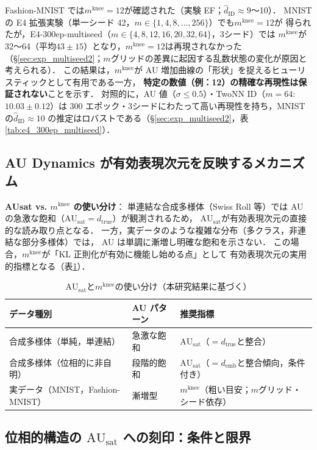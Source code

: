 \documentclass[11pt,a4paper]{jsarticle}
\newcommand{\dtrue}{d_{\mathrm{true}}}
\newcommand{\AUsat}{\mathrm{AU}_{\mathrm{sat}}}
\newcommand{\mknee}{m^{\mathrm{knee}}}
\newcommand{\demb}{d_{\mathrm{emb}}}
\begin{document}
Fashion-MNIST では$\mknee = 12$が確認された（実験 EF；$\hat{d}_\mathrm{ID} \approx 9$〜10）．
MNIST の E4 拡張実験（単一シード 42，$m \in \{1, 4, 8, \ldots, 256\}$）でも$\mknee = 12$が
得られたが，E4-300ep-multiseed（$m \in \{4, 8, 12, 16, 20, 32, 64\}$，3シード）では
$\mknee$が 32〜64（平均$43 \pm 15$）となり，$\mknee = 12$は再現されなかった
（§\ref{sec:exp_multiseed2}；$m$グリッドの差異に起因する乱数状態の変化が原因と考えられる）．
この結果は，$\mknee$が AU 増加曲線の「形状」を捉えるヒューリスティックとして有用である一方，
\textbf{特定の数値（例：12）の精確な再現性は保証されない}ことを示す．
対照的に，AU 値（$\sigma \leq 0.5$）・TwoNN ID（$m=64$: $10.03 \pm 0.12$）は
300 エポック・3シードにわたって高い再現性を持ち，MNIST の$\hat{d}_\mathrm{ID} \approx 10$
の推定はロバストである（§\ref{sec:exp_multiseed2}，表\ref{tab:e4_300ep_multiseed}）．

\subsection{AU Dynamics が有効表現次元を反映するメカニズム}\label{sec:disc_au_dynamics}

\textbf{AUsat vs. $\mknee$ の使い分け}：
単連結な合成多様体（Swiss Roll 等）では AU の急激な飽和（$\AUsat = \dtrue$）が観測されるため，
$\AUsat$が有効表現次元の直接的な読み取り点となる．
一方，実データのような複雑な分布（多クラス，非連結な部分多様体）では，
AU は単調に漸増し明確な飽和を示さない．
この場合，$\mknee$が「KL 正則化が有効に機能し始める点」として
有効表現次元の実用的指標となる（表\ref{tab:au_comparison}）．

\begin{table}[H]
\centering
\caption{$\AUsat$と$\mknee$の使い分け（本研究結果に基づく）}
\label{tab:au_comparison}
\small
\begin{tabular}{lll}
\toprule
データ種別 & AU パターン & 推奨指標 \\
\midrule
合成多様体（単純，単連結） & 急激な飽和 & $\AUsat$（$= \dtrue$と整合） \\
合成多様体（位相的に非自明） & 段階的飽和 & $\AUsat$（$= \demb$と整合傾向，条件付き） \\
実データ（MNIST，Fashion-MNIST） & 漸増型 & $\mknee$（粗い目安；$m$グリッド・シード依存） \\
\bottomrule
\end{tabular}
\end{table}

\subsection{位相的構造の $\AUsat$ への刻印：条件と限界}\label{sec:disc_topology}
\end{document}
